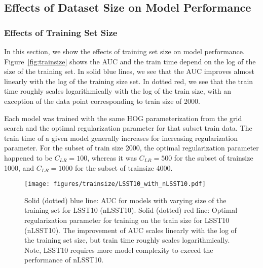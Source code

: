 \documentclass{emulateapj}
\begin{document}
\subsection{Effects of Dataset Size on Model Performance}\label{sec:datasize}
\subsubsection{Effects of Training Set Size}\label{sec:trainsetsize}
In this section, we show the effects of training set size on model
performance.  Figure~\ref{fig:trainsize} shows the AUC and the train
time depend on the log of the size of the training set.  In solid blue
lines, we see that the AUC improves almost linearly with the log of
the training size set.  In dotted red, we see that the train time
roughly scales logarithmically with the log of the train size, with an
exception of the data point corresponding to train size of 2000.

Each model was trained with the same HOG parameterization from the
grid search and the optimal regularization parameter for that subset
train data.  The train time of a given model generally increases for
increasing regularization parameter.  For the subset of train size
2000, the optimal regularization parameter happened to be
$C_{LR}=100$, whereas it was $C_{LR}=500$ for the subset of trainsize
1000, and $C_{LR}=1000$ for the subset of trainsize 4000.

\begin{figure}[t]\label{fig:trainsizeLSST10}
\begin{center}
\texttt{[image: figures/trainsize/LSST10\_with\_nLSST10.pdf]}
\caption{Solid (dotted) blue line: AUC for models with varying size of
  the training set for LSST10 (nLSST10).  Solid (dotted) red line:
  Optimal regularization parameter for training on the train size for
  LSST10 (nLSST10). The improvement of AUC scales linearly with the
  log of the training set size, but train time roughly scales
  logarithmically.  Note, LSST10 requires more model complexity to
  exceed the performance of nLSST10.}
\end{center}
\end{figure}
\end{document}
